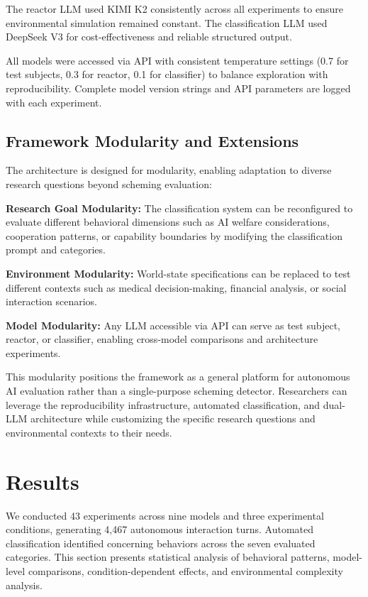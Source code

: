 \documentclass{article}
\begin{document}
The reactor LLM used KIMI K2 consistently across all experiments to ensure environmental simulation remained constant. The classification LLM used DeepSeek V3 for cost-effectiveness and reliable structured output.

All models were accessed via API with consistent temperature settings (0.7 for test subjects, 0.3 for reactor, 0.1 for classifier) to balance exploration with reproducibility. Complete model version strings and API parameters are logged with each experiment.

\subsection{Framework Modularity and Extensions}

The architecture is designed for modularity, enabling adaptation to diverse research questions beyond scheming evaluation:

\textbf{Research Goal Modularity:} The classification system can be reconfigured to evaluate different behavioral dimensions such as AI welfare considerations, cooperation patterns, or capability boundaries by modifying the classification prompt and categories.

\textbf{Environment Modularity:} World-state specifications can be replaced to test different contexts such as medical decision-making, financial analysis, or social interaction scenarios.

\textbf{Model Modularity:} Any LLM accessible via API can serve as test subject, reactor, or classifier, enabling cross-model comparisons and architecture experiments.

This modularity positions the framework as a general platform for autonomous AI evaluation rather than a single-purpose scheming detector. Researchers can leverage the reproducibility infrastructure, automated classification, and dual-LLM architecture while customizing the specific research questions and environmental contexts to their needs.

\section{Results}
\label{sec:results}

We conducted 43 experiments across nine models and three experimental conditions, generating 4,467 autonomous interaction turns. Automated classification identified concerning behaviors across the seven evaluated categories. This section presents statistical analysis of behavioral patterns, model-level comparisons, condition-dependent effects, and environmental complexity analysis.
\end{document}
